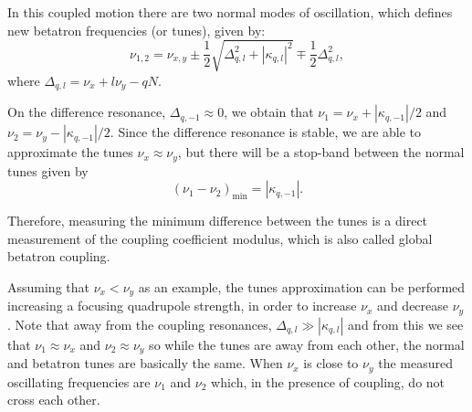 In this coupled motion there are two normal modes of oscillation, which defines new betatron frequencies (or tunes), given by:
\begin{equation}
    \nu_{1, 2} = \nu_{x, y} \pm \dfrac{1}{2}\sqrt{\Delta_{q, l}^2 + |\kappa_{q, l}|^2} \mp \dfrac{1}{2}\Delta_{q, l}^2,
    \label{eq:eigentunes}
\end{equation}
where $\Delta_{q, l} = \nu_x + l\nu_y - q N$. 

On the difference resonance, $\Delta_{q, -1} \approx 0$, we obtain that $\nu_1 = \nu_x + |\kappa_{q, -1}|/2$ and $\nu_2 = \nu_y - |\kappa_{q, -1}|/2$. Since the difference resonance is stable, we are able to approximate the tunes $\nu_x \approx \nu_y$, but there will be a stop-band between the normal tunes given by
\begin{equation}
\left(\nu_1 - \nu_2\right)_{\mathrm{min}} = |\kappa_{q, -1}|.
\end{equation}

Therefore, measuring the minimum difference between the tunes is a direct measurement of the coupling coefficient modulus, which is also called global betatron coupling. 

Assuming that $\nu_x < \nu_y$ as an example, the tunes approximation can be performed increasing a focusing quadrupole strength, in order to increase $\nu_x$ and decrease $\nu_y$. Note that away from the coupling resonances, $\Delta_{q, l} \gg |\kappa_{q, l}|$ and from this we see that $\nu_1 \approx \nu_x$ and $\nu_2 \approx \nu_y$ so while the tunes are away from each other, the normal and betatron tunes are basically the same. When $\nu_x$ is close to $\nu_y$ the measured oscillating frequencies are $\nu_1$ and $\nu_2$ which, in the presence of coupling, do not cross each other.








